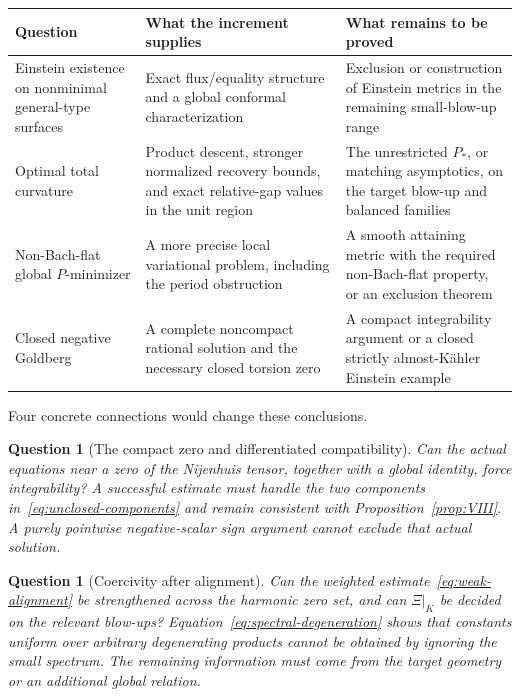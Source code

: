 \documentclass[11pt]{article}
\newtheorem{question}[theorem]{Question}
\theoremstyle{definition}
\theoremstyle{remark}
\begin{document}
\begin{center}\small
\begin{tabularx}{\textwidth}{@{}p{}XX@{}}
\toprule
Question & What the increment supplies & What remains to be proved\\
\midrule
Einstein existence on nonminimal general-type surfaces &
Exact flux/equality structure and a global conformal characterization &
Exclusion or construction of Einstein metrics in the remaining small-blow-up range\\
Optimal total curvature &
Product descent, stronger normalized recovery bounds, and exact relative-gap values in the unit region &
The unrestricted $P_*$, or matching asymptotics, on the target blow-up and balanced families\\
Non-Bach-flat global $P$-minimizer &
A more precise local variational problem, including the period obstruction &
A smooth attaining metric with the required non-Bach-flat property, or an exclusion theorem\\
Closed negative Goldberg &
A complete noncompact rational solution and the necessary closed torsion zero &
A compact integrability argument or a closed strictly almost-K\"ahler Einstein example\\
\bottomrule
\end{tabularx}
\end{center}

Four concrete connections would change these conclusions.

\begin{question}[The compact zero and differentiated compatibility]
Can the actual equations near a zero of the Nijenhuis tensor, together
with a global identity, force integrability? A successful estimate must
handle the two components in~\eqref{eq:unclosed-components} and remain
consistent with Proposition~\ref{prop:VIII}. A purely pointwise
negative-scalar sign argument cannot exclude that actual solution.
\end{question}

\begin{question}[Coercivity after alignment]
Can the weighted estimate~\eqref{eq:weak-alignment} be strengthened across
the harmonic zero set, and can $\Xi|_K$ be decided on the relevant
blow-ups? Equation~\eqref{eq:spectral-degeneration} shows that constants
uniform over arbitrary degenerating products cannot be obtained by
ignoring the small spectrum. The remaining information must come from
the target geometry or an additional global relation.
\end{question}
\end{document}
